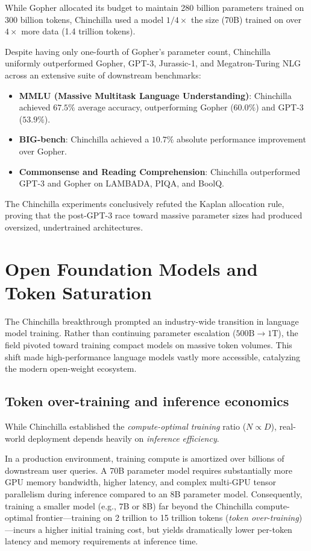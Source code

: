 \documentclass[../../../main.tex]{subfiles}
\begin{document}
While Gopher allocated its budget to maintain 280 billion parameters trained on 300 billion tokens, Chinchilla used a model $1/4\times$ the size (70B) trained on over $4\times$ more data (1.4 trillion tokens).

Despite having only one-fourth of Gopher's parameter count, Chinchilla uniformly outperformed Gopher, GPT-3, Jurassic-1, and Megatron-Turing NLG across an extensive suite of downstream benchmarks:
\begin{itemize}
    \item \textbf{MMLU (Massive Multitask Language Understanding)}: Chinchilla achieved $67.5\%$ average accuracy, outperforming Gopher ($60.0\%$) and GPT-3 ($53.9\%$).
    \item \textbf{BIG-bench}: Chinchilla achieved a $10.7\%$ absolute performance improvement over Gopher.
    \item \textbf{Commonsense and Reading Comprehension}: Chinchilla outperformed GPT-3 and Gopher on LAMBADA, PIQA, and BoolQ.
\end{itemize}
The Chinchilla experiments conclusively refuted the Kaplan allocation rule, proving that the post-GPT-3 race toward massive parameter sizes had produced oversized, undertrained architectures.


\section{Open Foundation Models and Token Saturation}
\label{sec:open_models_paradigm}

The Chinchilla breakthrough prompted an industry-wide transition in language model training. Rather than continuing parameter escalation ($500\text{B} \to 1\text{T}$), the field pivoted toward training compact models on massive token volumes. This shift made high-performance language models vastly more accessible, catalyzing the modern open-weight ecosystem.


\subsection{Token over-training and inference economics}
\label{subsec:inference_economics}

While Chinchilla established the \emph{compute-optimal training} ratio ($N \propto D$), real-world deployment depends heavily on \emph{inference efficiency}.

In a production environment, training compute is amortized over billions of downstream user queries. A 70B parameter model requires substantially more GPU memory bandwidth, higher latency, and complex multi-GPU tensor parallelism during inference compared to an 8B parameter model. Consequently, training a smaller model (e.g., 7B or 8B) far beyond the Chinchilla compute-optimal frontier—training on 2 trillion to 15 trillion tokens (\emph{token over-training})—incurs a higher initial training cost, but yields dramatically lower per-token latency and memory requirements at inference time.
\end{document}
